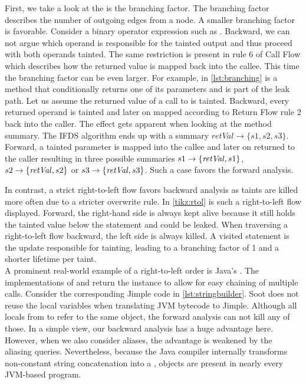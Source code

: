 \documentclass[../draft.tex]{subfiles}
\begin{document}
    First, we take a look at the is the branching factor.
    The branching factor describes the number of outgoing edges from a node.
    A smaller branching factor is favorable.
    Consider a binary operator expression such as .
    Backward, we can not argue which operand is responsible for the tainted output and thus proceed with both operands tainted.
    The same restriction is present in rule 6 of Call Flow which describes how the returned value is mapped back into the callee.
    This time the branching factor can be even larger.
    For example, in \autoref{lst:branching} is a method that conditionally returns one of its parameters and is part of the leak path.
    Let us assume the returned value of a call to  is tainted. Backward, every returned operand is tainted and later on mapped according to Return Flow rule 2 back into the caller.
    The effect gets apparent when looking at the method summary.
    The IFDS algorithm ends up with a summary $\mathit{retVal} \rightarrow \{s1, s2, s3\}$.
    Forward, a tainted parameter is mapped into the callee and later on returned to the caller resulting in three possible summaries  $s1 \rightarrow \mathit\{\mathit{retVal}, s1\}$, $s2 \rightarrow \mathit\{\mathit{retVal}, s2\}$ or $s3 \rightarrow \mathit\{\mathit{retVal}, s3\}$.
    Such a case favors the forward analysis.

    In contrast, a strict right-to-left flow favors backward analysis as taints are killed more often due to a stricter overwrite rule.
    In \autoref{tikz:rtol} is such a right-to-left flow displayed.
    Forward, the right-hand side is always kept alive because it still holds the tainted value below the statement and could be leaked.
    When traversing a right-to-left flow backward, the left side is always killed.
    A visited statement is the update responsible for tainting, leading to a branching factor of 1 and a shorter lifetime per taint.\\
    A prominent real-world example of a right-to-left order is Java's .
    The implementations of  and  return the  instance to allow for easy chaining of multiple calls.
    Consider the corresponding Jimple code in \autoref{lst:stringbuilder}.
    Soot does not reuse the local variables when translating JVM bytecode to Jimple\footnotemark{}.
    Although all locals from  to  refer to the same object, the forward analysis can not kill any of those.
    In a simple view, our backward analysis has a huge advantage here.
    However, when we also consider aliases, the advantage is weakened by the aliasing queries.
    Nevertheless, because the Java compiler internally transforms non-constant string concatenation into a ,  objects are present in nearly every JVM-based program.
\end{document}
